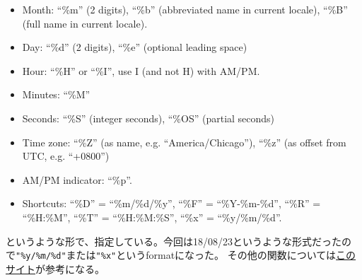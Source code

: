 \documentclass[]{article}
\begin{document}
\begin{itemize}
\item
  Month: ``\%m'' (2 digits), ``\%b'' (abbreviated name in current
  locale), ``\%B'' (full name in current locale).
\item
  Day: ``\%d'' (2 digits), ``\%e'' (optional leading space)
\item
  Hour: ``\%H'' or ``\%I'', use I (and not H) with AM/PM.
\item
  Minutes: ``\%M''
\item
  Seconds: ``\%S'' (integer seconds), ``\%OS'' (partial seconds)
\item
  Time zone: ``\%Z'' (as name, e.g. ``America/Chicago''), ``\%z'' (as
  offset from UTC, e.g. ``+0800'')
\item
  AM/PM indicator: ``\%p''.
\item
  Shortcuts: ``\%D'' = ``\%m/\%d/\%y'', ``\%F'' = ``\%Y-\%m-\%d'',
  ``\%R'' = ``\%H:\%M'', ``\%T'' = ``\%H:\%M:\%S'', ``\%x'' =
  ``\%y/\%m/\%d''.
\end{itemize}

というような形で、指定している。今回は18/08/23というような形式だったので\texttt{"\%y/\%m/\%d"}または\texttt{"\%x"}というformatになった。
その他の関数については\href{https://heavywatal.github.io/rstats/readr.html}{このサイト}が参考になる。
\end{document}
